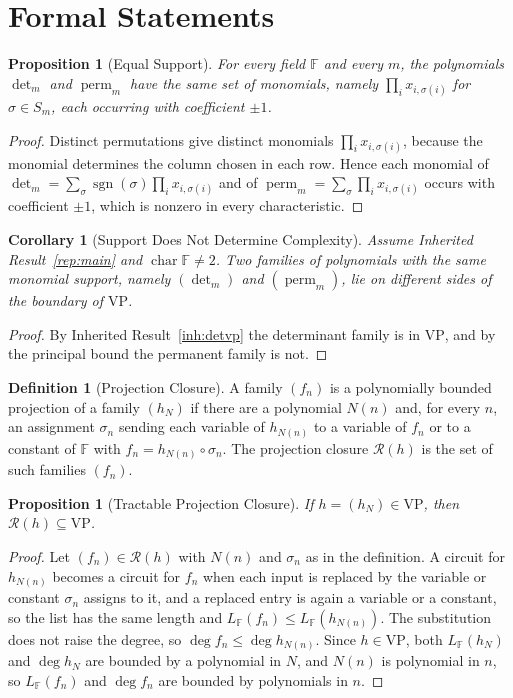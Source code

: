 \documentclass[11pt,letterpaper]{report}
\theoremstyle{plain}
\newtheorem{proposition}[theorem]{Proposition}
\newtheorem{corollary}[theorem]{Corollary}
\theoremstyle{definition}
\newtheorem{definition}[theorem]{Definition}
\theoremstyle{remark}
\DeclareMathOperator{\perm}{perm}
\newcommand{\VP}{\mathrm{VP}}
\begin{document}
\section{Formal Statements}

\begin{proposition}[Equal Support]\label{pr:support0}
For every field $\mathbb F$ and every $m$, the polynomials $\det_m$ and $\perm_m$ have the same set of monomials, namely $\prod_ix_{i,\sigma(i)}$ for $\sigma\in S_m$, each occurring with coefficient $\pm1$.
\end{proposition}
\begin{proof}
Distinct permutations give distinct monomials $\prod_ix_{i,\sigma(i)}$, because the monomial determines the column chosen in each row. Hence each monomial of $\det_m=\sum_\sigma\operatorname{sgn}(\sigma)\prod_ix_{i,\sigma(i)}$ and of $\perm_m=\sum_\sigma\prod_ix_{i,\sigma(i)}$ occurs with coefficient $\pm1$, which is nonzero in every characteristic.
\end{proof}

\begin{corollary}[Support Does Not Determine Complexity]
Assume Inherited Result~\ref{rep:main} and $\operatorname{char}\mathbb F\ne2$. Two families of polynomials with the same monomial support, namely $(\det_m)$ and $(\perm_m)$, lie on different sides of the boundary of $\VP$.
\end{corollary}
\begin{proof}
By Inherited Result~\ref{inh:detvp} the determinant family is in $\VP$, and by the principal bound the permanent family is not.
\end{proof}

\begin{definition}[Projection Closure]\label{def:projclosure}
A family $(f_n)$ is a polynomially bounded projection of a family $(h_N)$ if there are a polynomial $N(n)$ and, for every $n$, an assignment $\sigma_n$ sending each variable of $h_{N(n)}$ to a variable of $f_n$ or to a constant of $\mathbb F$ with $f_n=h_{N(n)}\circ\sigma_n$. The projection closure $\mathcal R(h)$ is the set of such families $(f_n)$.
\end{definition}

\begin{proposition}[Tractable Projection Closure]\label{pr:projclosure}
If $h=(h_N)\in\VP$, then $\mathcal R(h)\subseteq\VP$.
\end{proposition}
\begin{proof}
Let $(f_n)\in\mathcal R(h)$ with $N(n)$ and $\sigma_n$ as in the definition. A circuit for $h_{N(n)}$ becomes a circuit for $f_n$ when each input is replaced by the variable or constant $\sigma_n$ assigns to it, and a replaced entry is again a variable or a constant, so the list has the same length and $L_{\mathbb F}(f_n)\le L_{\mathbb F}(h_{N(n)})$. The substitution does not raise the degree, so $\deg f_n\le\deg h_{N(n)}$. Since $h\in\VP$, both $L_{\mathbb F}(h_N)$ and $\deg h_N$ are bounded by a polynomial in $N$, and $N(n)$ is polynomial in $n$, so $L_{\mathbb F}(f_n)$ and $\deg f_n$ are bounded by polynomials in $n$.
\end{proof}
\end{document}
